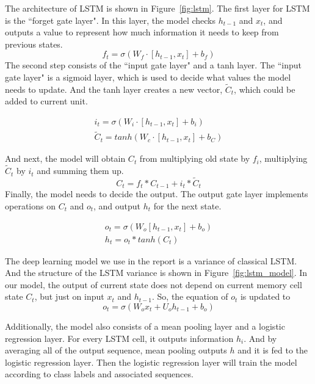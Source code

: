 The architecture of LSTM is shown in Figure~\ref{fig:lstm}. The first layer for LSTM is the ``forget gate layer". In this layer, the model checks $h_{t-1}$ and $x_t$, and outputs a value to represent how much information it needs to keep from previous states. 
$$f_t = \sigma (W_f \cdot [h_{t-1}, x_t] + b_f)$$
The second step consists of the ``input gate layer" and a tanh layer. The ``input gate layer" is a sigmoid layer, which is used to decide what values the model needs to update. And the tanh layer creates a new vector, $\tilde{C}_t$, which could be added to current unit.
 
\begin{align*}
i_t = \sigma (W_i \cdot [h_{t-1}, x_t] + b_i) \\
\tilde{C}_t = tanh(W_c \cdot [h_{t-1}, x_t] + b_C)
\end{align*}

And next, the model will obtain $C_t$ from multiplying old state by $f_i$, multiplying $\tilde{C}_t$ by $i_t$ and summing them up. 
$$C_t = f_t * C_{t-1} + i_t * \tilde{C}_t$$
Finally, the model needs to decide the output. The output gate layer implements operations on $C_t$ and $o_t$, and output $h_t$ for the next state.

\begin{align*}
o_t = \sigma (W_o [h_{t-1}, x_t] + b_o) \\
h_t = o_t * tanh(C_t)
\end{align*}

The deep learning model we use in the report is a variance of classical LSTM. And the structure of the LSTM variance is shown in Figure~\ref{fig:lstm_model}. In our model, the output of current state does not depend on current memory cell state $C_t$, but just on input $x_t$ and $h_{t-1}$. So, the equation of $o_t$ is updated to
$$
o_t = \sigma (W_o x_t + U_o h_{t-1} + b_o)
$$

Additionally, the model also consists of a mean pooling layer and a logistic regression layer. For every LSTM cell, it outputs information $h_i$. And by averaging all of the output sequence, mean pooling outputs $h$ and it is fed to the logistic regression layer. Then the logistic regression layer will train the model according to class labels and associated sequences.


